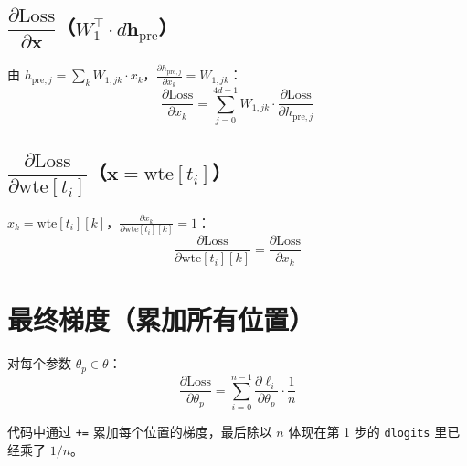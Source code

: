 \documentclass[12pt,a4paper]{article}
\begin{document}
\subsection{$\dfrac{\partial \text{Loss}}{\partial \mathbf{x}}$（$W_1^\top \cdot d\mathbf{h}_{\text{pre}}$）}

由 $h_{\text{pre},j} = \sum_k W_{1,jk} \cdot x_k$，$\frac{\partial h_{\text{pre},j}}{\partial x_k} = W_{1,jk}$：
\[
\frac{\partial \text{Loss}}{\partial x_k} = \sum_{j=0}^{4d-1} W_{1,jk} \cdot \frac{\partial \text{Loss}}{\partial h_{\text{pre},j}}
\]

\subsection{$\dfrac{\partial \text{Loss}}{\partial \text{wte}[t_i]}$（$\mathbf{x} = \text{wte}[t_i]$）}

$x_k = \text{wte}[t_i][k]$，$\frac{\partial x_k}{\partial \text{wte}[t_i][k]} = 1$：
\[
\frac{\partial \text{Loss}}{\partial \text{wte}[t_i][k]} = \frac{\partial \text{Loss}}{\partial x_k}
\]

\section{最终梯度（累加所有位置）}

对每个参数 $\theta_p \in \theta$：
\[
\frac{\partial \text{Loss}}{\partial \theta_p} = \sum_{i=0}^{n-1} \frac{\partial \ell_i}{\partial \theta_p} \cdot \frac{1}{n}
\]

代码中通过 \texttt{+=} 累加每个位置的梯度，最后除以 $n$ 体现在第 1 步的 \texttt{dlogits} 里已经乘了 $1/n$。
\end{document}

